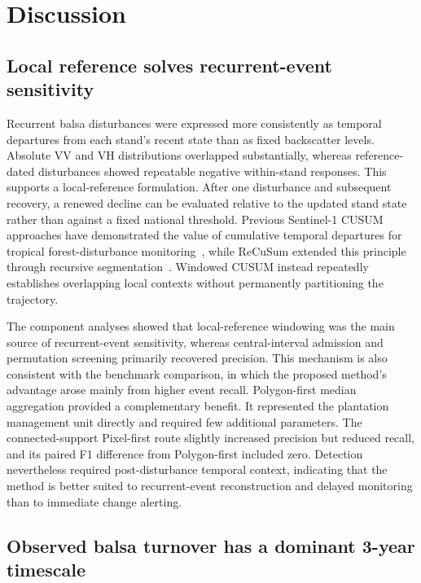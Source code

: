 \section{Discussion}\label{sec:discussion}


\subsection{Local reference solves recurrent-event sensitivity}
Recurrent balsa disturbances were expressed more consistently as temporal departures from each stand's recent state than as fixed backscatter levels. Absolute VV and VH distributions overlapped substantially, whereas reference-dated disturbances showed repeatable negative within-stand responses. This supports a local-reference formulation. After one disturbance and subsequent recovery, a renewed decline can be evaluated relative to the updated stand state rather than against a fixed national threshold. Previous Sentinel-1 CUSUM approaches have demonstrated the value of cumulative temporal departures for tropical forest-disturbance monitoring~\citep{Ygorra2021CuSum,Aquino2022RadarDisturbance}, while ReCuSum extended this principle through recursive segmentation~\citep{Ygorra2023ReCuSum}. Windowed CUSUM instead repeatedly establishes overlapping local contexts without permanently partitioning the trajectory.

The component analyses showed that local-reference windowing was the main source of recurrent-event sensitivity, whereas central-interval admission and permutation screening primarily recovered precision. This mechanism is also consistent with the benchmark comparison, in which the proposed method's advantage arose mainly from higher event recall. Polygon-first median aggregation provided a complementary benefit. It represented the plantation management unit directly and required few additional parameters. The connected-support Pixel-first route slightly increased precision but reduced recall, and its paired F1 difference from Polygon-first included zero. Detection nevertheless required post-disturbance temporal context, indicating that the method is better suited to recurrent-event reconstruction and delayed monitoring than to immediate change alerting.






\subsection{Observed balsa turnover has a dominant 3-year timescale}

